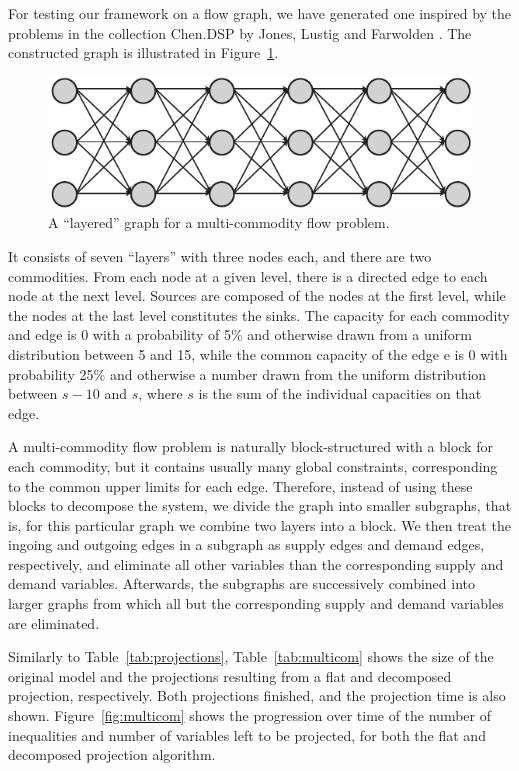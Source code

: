 \documentclass{llncs}
\begin{document}
For testing our framework on a flow graph, we have generated one inspired by the problems in the collection Chen.DSP by Jones, Lustig and Farwolden \cite{JLFP93}. The constructed graph is illustrated in Figure~\ref{fig:multiflow}. 
%
\begin{figure}[tb]
	\centering
		\includegraphics[scale=0.6]{figures/multiflow2.pdf}
	\caption{A ``layered''  graph for a multi-commodity flow problem.}
	\label{fig:multiflow}
\end{figure}
%
It consists of seven ``layers'' with three nodes each, and there are two commodities. From each node at a given level, there is a directed edge to each node at the next level. Sources are composed of the nodes at the first level, while the nodes at the last level constitutes the sinks. The capacity for each commodity and edge is 0 with a probability of 5\% and otherwise drawn from a uniform distribution between 5 and 15, while the common capacity of the edge e is 0 with probability 25\% and otherwise a number drawn from the uniform distribution between $s-10$ and $s$, where $s$ is the sum of the individual capacities on that edge. 

A multi-commodity flow problem is naturally block-structured with a block for each commodity, but it contains usually many global constraints, corresponding to the common upper limits for each edge. Therefore, instead of using these blocks to decompose the system, we divide the graph into smaller subgraphs, that is, for this particular graph we combine two layers into a block. We then treat the ingoing and outgoing edges in a subgraph as supply edges and demand edges, respectively, and eliminate all other variables than the corresponding supply and demand variables. Afterwards, the subgraphs are successively combined into larger graphs from which all but the corresponding supply and demand variables are eliminated. 

Similarly to Table~\ref{tab:projections}, Table~\ref{tab:multicom} shows the size of the original model and the projections resulting from a flat and decomposed projection, respectively. Both projections finished, and the projection time is also shown. Figure~\ref{fig:multicom} shows the progression over time of the number of inequalities and number of variables left to be projected, for both the flat and decomposed projection algorithm.
\end{document}
